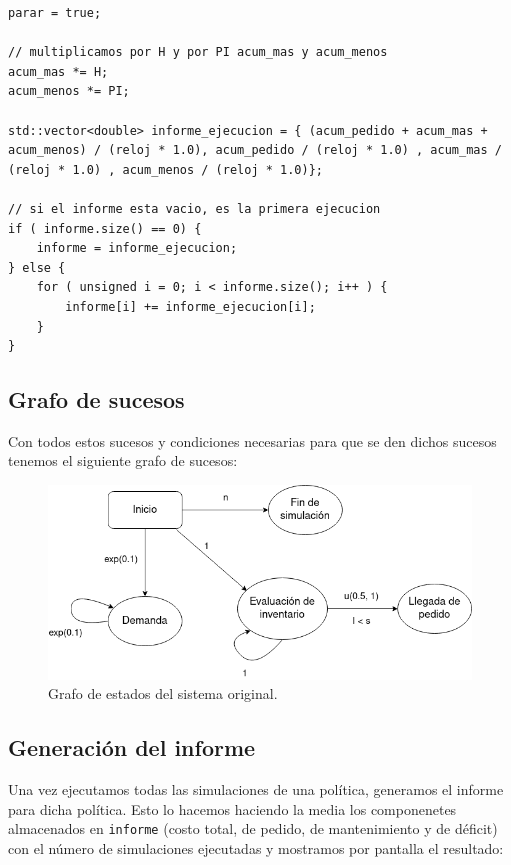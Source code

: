 \documentclass[12pt, spanish]{article}
\begin{document}
\begin{lstlisting}
parar = true;

// multiplicamos por H y por PI acum_mas y acum_menos
acum_mas *= H;
acum_menos *= PI;

std::vector<double> informe_ejecucion = { (acum_pedido + acum_mas + acum_menos) / (reloj * 1.0), acum_pedido / (reloj * 1.0) , acum_mas / (reloj * 1.0) , acum_menos / (reloj * 1.0)};

// si el informe esta vacio, es la primera ejecucion
if ( informe.size() == 0) {
	informe = informe_ejecucion;
} else {
	for ( unsigned i = 0; i < informe.size(); i++ ) {
		informe[i] += informe_ejecucion[i];
	}
}
\end{lstlisting}



\subsection{Grafo de sucesos}

Con todos estos sucesos y condiciones necesarias para que se den dichos sucesos tenemos el siguiente grafo de sucesos:

\begin{figure}[H]
  \centering
   \includegraphics[width=\textwidth]{grafo_sucesos_original.png}
	\caption{Grafo de estados del sistema original.}
\end{figure}


\subsection{Generación del informe}

Una vez ejecutamos todas las simulaciones de una política, generamos el informe para dicha política. Esto lo hacemos haciendo la media los componenetes almacenados en \texttt{informe} (costo total, de pedido, de mantenimiento y de déficit) con el número de simulaciones ejecutadas y mostramos por pantalla el resultado:
\end{document}
